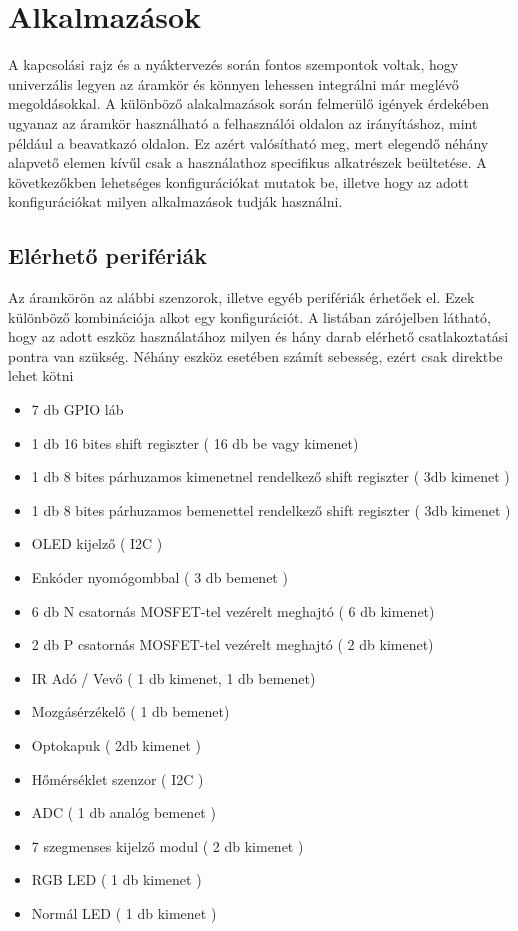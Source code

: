 \chapter{Alkalmazások}

A kapcsolási rajz és a nyáktervezés során fontos szempontok voltak, hogy univerzális legyen az áramkör és könnyen lehessen integrálni már meglévő megoldásokkal. A különböző alakalmazások során felmerülő igények érdekében ugyanaz az áramkör használható a felhasználói oldalon az irányításhoz, mint például a beavatkazó oldalon. Ez azért valósítható meg, mert elegendő néhány alapvető elemen kívűl csak a használathoz specifikus alkatrészek beültetése.
A következőkben lehetséges konfigurációkat mutatok be, illetve hogy az adott konfigurációkat milyen alkalmazások tudják használni.

\section{Elérhető perifériák}
Az áramkörön az alábbi szenzorok, illetve egyéb perifériák érhetőek el. Ezek különböző kombinációja alkot egy konfigurációt. A listában zárójelben látható, hogy az adott eszköz használatához milyen és hány darab elérhető csatlakoztatási pontra van szükség. Néhány eszköz esetében számít sebesség, ezért csak direktbe lehet kötni
\begin{itemize}
    \item 7 db GPIO láb
    \item 1 db 16 bites shift regiszter ( 16 db be vagy kimenet)
    \item 1 db 8 bites párhuzamos kimenetnel rendelkező shift regiszter ( 3db kimenet )
    \item 1 db 8 bites párhuzamos bemenettel rendelkező shift regiszter ( 3db kimenet )
    \item OLED kijelző ( I2C )
    \item Enkóder nyomógombbal ( 3 db bemenet )
    \item 6 db N csatornás MOSFET-tel vezérelt meghajtó ( 6 db kimenet)
    \item 2 db P csatornás MOSFET-tel vezérelt meghajtó ( 2 db kimenet)
    \item IR Adó / Vevő ( 1 db kimenet, 1 db bemenet)
    \item Mozgásérzékelő ( 1 db bemenet)
    \item Optokapuk ( 2db kimenet )
    \item Hőmérséklet szenzor ( I2C )
    \item ADC ( 1 db analóg bemenet )
    \item 7 szegmenses kijelző modul ( 2 db kimenet )
    \item RGB LED ( 1 db kimenet )
    \item Normál LED ( 1 db kimenet )
\end{itemize}

